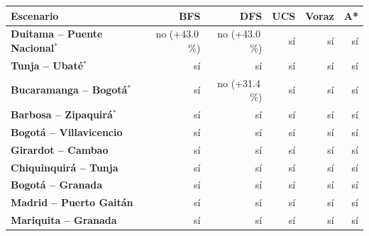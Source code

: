 \renewcommand{\arraystretch}{1.2}
\begin{tabular}{|l|r|r|r|r|r|}
\hline
\rowcolor{gray!20} \textbf{Escenario} & \textbf{BFS} & \textbf{DFS} & \textbf{UCS} & \textbf{Voraz} & \textbf{A*} \\
\hline
\textbf{Duitama -- Puente Nacional$^{*}$} & no (+43.0\,\%) & no (+43.0\,\%) & sí & sí & sí \\
\hline
\textbf{Tunja -- Ubaté$^{*}$} & sí & sí & sí & sí & sí \\
\hline
\textbf{Bucaramanga -- Bogotá$^{*}$} & sí & no (+31.4\,\%) & sí & sí & sí \\
\hline
\textbf{Barbosa -- Zipaquirá$^{*}$} & sí & sí & sí & sí & sí \\
\hline
\textbf{Bogotá -- Villavicencio} & sí & sí & sí & sí & sí \\
\hline
\textbf{Girardot -- Cambao} & sí & sí & sí & sí & sí \\
\hline
\textbf{Chiquinquirá -- Tunja} & sí & sí & sí & sí & sí \\
\hline
\textbf{Bogotá -- Granada} & sí & sí & sí & sí & sí \\
\hline
\textbf{Madrid -- Puerto Gaitán} & sí & sí & sí & sí & sí \\
\hline
\textbf{Mariquita -- Granada} & sí & sí & sí & sí & sí \\
\hline
\end{tabular}
